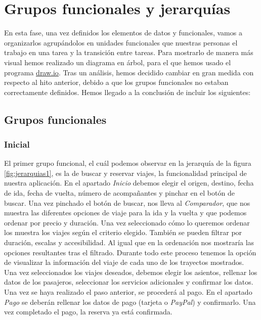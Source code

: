 \section{Grupos funcionales y jerarquías}

En esta fase, una vez definidos los elementos de datos y funcionales, vamos a
organizarlos agrupándolos en unidades funcionales que nuestras personas el
trabajo en una tarea y la transición entre tareas. Para mostrarlo de manera más
visual hemos realizado un diagrama en árbol, para el que hemos usado el
programa \underline{\href{https://www.drawio.com/}{draw.io}}. Tras un análisis, 
hemos decidido cambiar en gran medida con respecto al hito anterior, debido a que los
grupos funcionales no estaban correctamente definidos. Hemos llegado a la conclusión de incluir
los siguientes:

\subsection{Grupos funcionales}

\subsubsection{Inicial}

El primer grupo funcional, el cuál podemos observar en la jerarquía de la figura \ref{fig:jerarquias1}, es la de buscar y
reservar viajes, la funcionalidad principal de nuestra aplicación. En el apartado \textit{Inicio}
debemos elegir el origen, destino, fecha de ida, fecha de vuelta, número de
acompañantes y pinchar en el botón de buscar. Una vez pinchado el botón de buscar, nos lleva al
\textit{Comparador}, que nos muestra las diferentes opciones de viaje para la ida y la vuelta y que podemos
ordenar por precio y duración. Una vez seleccionado cómo lo queremos ordenar los muestra los viajes
según el criterio elegido. También se pueden filtrar por duración, escalas y accesibilidad. Al
igual que en la ordenación nos mostraría las opciones resultantes tras el filtrado. Durante todo
este proceso tenemos la opción de visualizar la información del viaje de cada uno de
los trayectos mostrados. Una vez seleccionados los viajes deseados, debemos elegir los asientos,
rellenar los datos de los pasajeros, seleccionar los servicios adicionales y confirmar los datos.
Una vez se haya realizado el paso anterior, se procederá al pago. En el apartado \textit{Pago} se
deberán rellenar los datos de pago (tarjeta o \textit{PayPal}) y confirmarlo. Una vez completado el pago,
la reserva ya está confirmada.

